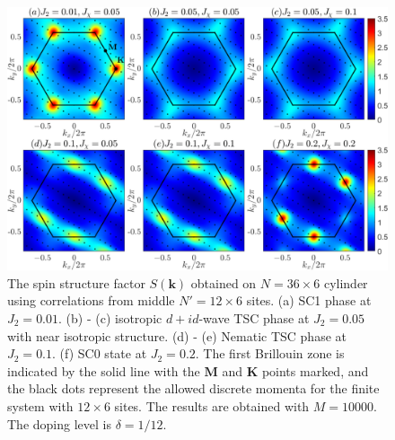 \documentclass[aps,prx,reprint,superscriptaddress,showpacs]{revtex4-2}
\begin{document}
\begin{figure}
\centering
\includegraphics[width=1\linewidth]{Spin_structure_new.pdf}
\caption{The spin structure factor $S(\mathbf{k})$ obtained on $N=36\times 6$ cylinder using correlations from middle $N'=12\times 6$ sites.  (a) SC1 phase at $J_{2}=0.01$. (b) - (c) isotropic $d+id$-wave TSC phase at $J_{2}=0.05$ with near isotropic structure. (d) - (e) Nematic TSC phase at $J_{2}=0.1$.  (f) SC0 state at $J_{2}=0.2$.  The first Brillouin zone is indicated by the solid line with the $\mathbf{M}$ and $\mathbf{K}$ points marked, and the black dots represent the allowed discrete momenta for the finite system with $12\times 6$ sites. The results are obtained with $M=10000$. The doping level is $\delta=1/12$.}
\label{Fig_spin_structure}
\end{figure}


\end{document}
